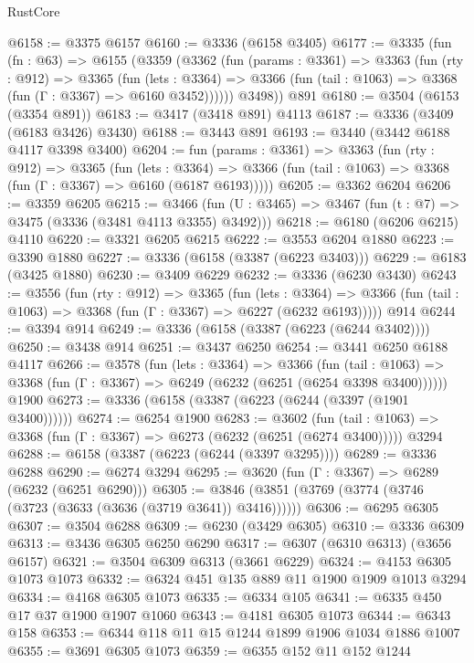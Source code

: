 \begin{lexlean}{RustCore}
\begin{coremodule}
@6158 := @3375 @6157
@6160 := @3336 (@6158 @3405)
@6177 := @3335
    (fun (fn : @63) =>
    @6155
      (@3359
        (@3362
          (fun (params : @3361) =>
          @3363
            (fun (rty : @912) =>
            @3365
              (fun (lets : @3364) =>
              @3366 (fun (tail : @1063) => @3368 (fun (Γ : @3367) => @6160 @3452))))))
        @3498))
    @891
@6180 := @3504 (@6153 (@3354 @891))
@6183 := @3417 (@3418 @891) @4113
@6187 := @3336 (@3409 (@6183 @3426) @3430)
@6188 := @3443 @891
@6193 := @3440 (@3442 @6188 @4117 @3398 @3400)
@6204 := fun (params : @3361) =>
  @3363
    (fun (rty : @912) =>
    @3365
      (fun (lets : @3364) =>
      @3366 (fun (tail : @1063) => @3368 (fun (Γ : @3367) => @6160 (@6187 @6193)))))
@6205 := @3362 @6204
@6206 := @3359 @6205
@6215 := @3466 (fun (U : @3465) => @3467 (fun (t : @7) => @3475 (@3336 (@3481 @4113 @3355) @3492)))
@6218 := @6180 (@6206 @6215) @4110
@6220 := @3321 @6205 @6215
@6222 := @3553 @6204 @1880
@6223 := @3390 @1880
@6227 := @3336 (@6158 (@3387 (@6223 @3403)))
@6229 := @6183 (@3425 @1880)
@6230 := @3409 @6229
@6232 := @3336 (@6230 @3430)
@6243 := @3556
    (fun (rty : @912) =>
    @3365
      (fun (lets : @3364) =>
      @3366 (fun (tail : @1063) => @3368 (fun (Γ : @3367) => @6227 (@6232 @6193)))))
    @914
@6244 := @3394 @914
@6249 := @3336 (@6158 (@3387 (@6223 (@6244 @3402))))
@6250 := @3438 @914
@6251 := @3437 @6250
@6254 := @3441 @6250 @6188 @4117
@6266 := @3578
    (fun (lets : @3364) =>
    @3366
      (fun (tail : @1063) => @3368 (fun (Γ : @3367) => @6249 (@6232 (@6251 (@6254 @3398 @3400))))))
    @1900
@6273 := @3336 (@6158 (@3387 (@6223 (@6244 (@3397 (@1901 @3400))))))
@6274 := @6254 @1900
@6283 := @3602
    (fun (tail : @1063) => @3368 (fun (Γ : @3367) => @6273 (@6232 (@6251 (@6274 @3400)))))
    @3294
@6288 := @6158 (@3387 (@6223 (@6244 (@3397 @3295))))
@6289 := @3336 @6288
@6290 := @6274 @3294
@6295 := @3620 (fun (Γ : @3367) => @6289 (@6232 (@6251 @6290)))
@6305 := @3846 (@3851 (@3769 (@3774 (@3746 (@3723 (@3633 (@3636 (@3719 @3641)) @3416))))))
@6306 := @6295 @6305
@6307 := @3504 @6288
@6309 := @6230 (@3429 @6305)
@6310 := @3336 @6309
@6313 := @3436 @6305 @6250 @6290
@6317 := @6307 (@6310 @6313) (@3656 @6157)
@6321 := @3504 @6309 @6313 (@3661 @6229)
@6324 := @4153 @6305 @1073 @1073
@6332 := @6324 @451 @135 @889 @11 @1900 @1909 @1013 @3294
@6334 := @4168 @6305 @1073
@6335 := @6334 @105
@6341 := @6335 @450 @17 @37 @1900 @1907 @1060
@6343 := @4181 @6305 @1073
@6344 := @6343 @158
@6353 := @6344 @118 @11 @15 @1244 @1899 @1906 @1034 @1886 @1007
@6355 := @3691 @6305 @1073
@6359 := @6355 @152 @11 @152 @1244

\end{coremodule}
\end{lexlean}
